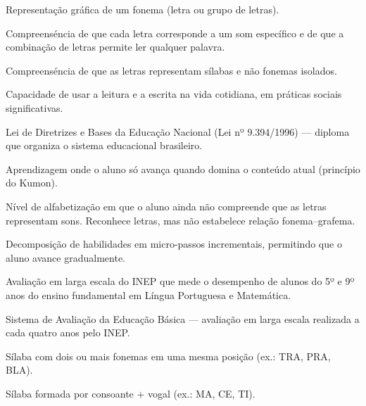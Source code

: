 \begin{description}[leftmargin=2.5cm, style=nextline]
  \item[Grafema] Representa\c{c}\~{a}o gr\'{a}fica de um fonema
  (letra ou grupo de letras).

  \item[Hip\'{o}tese Alfab\'{e}tica] Compreens\'{e}ncia de que cada
  letra corresponde a um som espec\'{i}fico e de que a combina\c{c}\~{a}o
  de letras permite ler qualquer palavra.

  \item[Hip\'{o}tese Sil\'{a}bica] Compreens\'{e}ncia de que as letras
  representam s\'{i}labas e n\~{a}o fonemas isolados.

  \item[Letramento] Capacidade de usar a leitura e a escrita na vida
  cotidiana, em pr\'{a}ticas sociais significativas.

  \item[LDB] Lei de Diretrizes e Bases da Educa\c{c}\~{a}o Nacional
  (Lei nº 9.394/1996) --- diploma que organiza o sistema educacional
  brasileiro.

  \item[Mastery-based] Aprendizagem onde o aluno s\'{o} avan\c{c}a
  quando domina o conte\'{u}do atual (princ\'{i}pio do Kumon).

  \item[Pré-sil\'{a}bico (n\'{i}vel)] N\'{i}vel de alfabetiza\c{c}\~{a}o
  em que o aluno ainda n\~{a}o compreende que as letras representam sons.
  Reconhece letras, mas n\~{a}o estabelece rela\c{c}\~{a}o
  fonema--grafema.

  \item[Progress\~{a}o Granular] Decomposi\c{c}\~{a}o de habilidades
  em micro-passos incrementais, permitindo que o aluno avance
  gradualmente.

  \item[Prova Brasil] Avalia\c{c}\~{a}o em larga escala do INEP que
  mede o desempenho de alunos do 5º e 9º anos do ensino fundamental
  em L\'{i}ngua Portuguesa e Matem\'{a}tica.

  \item[SAEB] Sistema de Avalia\c{c}\~{a}o da Educa\c{c}\~{a}o B\'{a}sica
  --- avalia\c{c}\~{a}o em larga escala realizada a cada quatro anos
  pelo INEP.

  \item[Sílaba Composta] S\'{i}laba com dois ou mais fonemas em uma
  mesma posi\c{c}\~{a}o (ex.: TRA, PRA, BLA).

  \item[Sílaba Direta] S\'{i}laba formada por consoante + vogal
  (ex.: MA, CE, TI).


\end{description}
